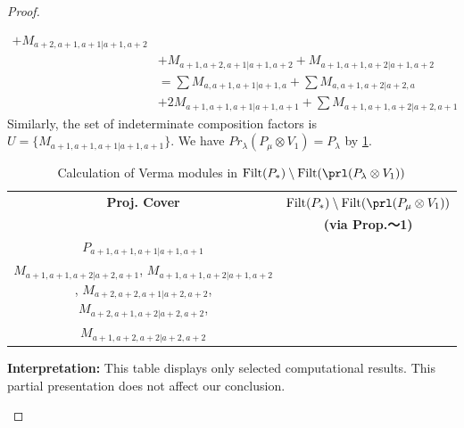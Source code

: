 \begin{proof}
\begin{enumerate}
\begin{enumerate}
\begin{equation}
\begin{aligned}
+ M_{a+2,a+1,a+1|a+1,a+2}\\
                                              &
+ M_{a+1,a+2,a+1|a+1,a+2}
+ M_{a+1,a+1,a+2|a+1,a+2} \\
                                               &=
\sum M_{a,a+1,a+1|a+1,a}
+ \sum M_{a,a+1,a+2|a+2,a}\\
                                               &
+ 2 M_{a+1,a+1,a+1|a+1,a+1}
+ \sum M_{a+1,a+1,a+2|a+2,a+1}
          \end{aligned}
        \end{equation}
      Similarly, the set of indeterminate composition factors is $U = \{
M_{a+1,a+1,a+1|a+1,a+1}
\}$. We have $Pr_{\lambda}(P_\mu \otimes V_{1}) = P_\lambda  $ by \cref{tab:verma-analysis_d_7}.
\begin{table}[htbp]
\centering
\caption{Calculation of Verma modules in $\operatorname{Filt}(P_*) \setminus \operatorname{Filt}(\prl(P_\lambda \otimes V_{1})) $ } \label{tab:verma-analysis_d_7}
\begin{tabular}{cc}
\toprule
\textbf{Proj. Cover} & \textbf{$\operatorname{Filt}(P_*) \setminus \operatorname{Filt}(\prl(P_\mu \otimes V_{1})) $}  \\
     & \textbf{(via Prop.～1)}  \\
\midrule
 $P_{a+1,a+1,a+1|a+1,a+1}$ & \makecell{
 $M_{a+2,a+1,a+1|a+2,a+1}$,
 $M_{a+2,a+1,a+1|a+1,a+2}$,
 $M_{a+1,a+2,a+1|a+2,a+1}$,
 $M_{a+1,a+2,a+1|a+1,a+2}$, \\
 $M_{a+1,a+1,a+2|a+2,a+1}$,
 $M_{a+1,a+1,a+2|a+1,a+2}$,
 $M_{a+2,a+2,a+1|a+2,a+2}$,
 $M_{a+2,a+1,a+2|a+2,a+2}$, \\
 $M_{a+1,a+2,a+2|a+2,a+2}$
}\\
\bottomrule
\end{tabular}
\vspace{0.5em}
\parbox{\linewidth}{\small
\textbf{Interpretation:}
This table displays only selected computational results. This partial presentation does not affect our conclusion.
}
\end{table}
      \end{enumerate}


\end{enumerate}
\end{proof}
